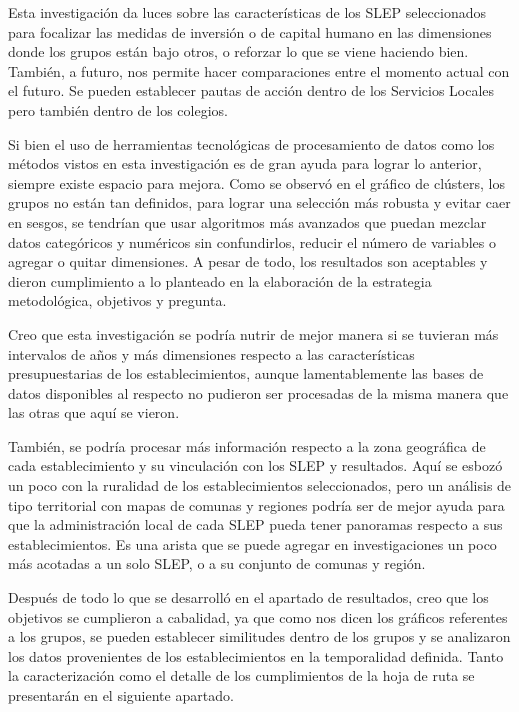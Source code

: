 \documentclass[
  12pt,
  letterpaper,
]{article}
\begin{document}
Esta investigación da luces sobre las características de los SLEP seleccionados para focalizar las medidas de inversión o de capital humano en las dimensiones donde los grupos están bajo otros, o reforzar lo que se viene haciendo bien.
También, a futuro, nos permite hacer comparaciones entre el momento actual con el futuro.
Se pueden establecer pautas de acción dentro de los Servicios Locales pero también dentro de los colegios.

Si bien el uso de herramientas tecnológicas de procesamiento de datos como los métodos vistos en esta investigación es de gran ayuda para lograr lo anterior, siempre existe espacio para mejora.
Como se observó en el gráfico de clústers, los grupos no están tan definidos, para lograr una selección más robusta y evitar caer en sesgos, se tendrían que usar algoritmos más avanzados que puedan mezclar datos categóricos y numéricos sin confundirlos, reducir el número de variables o agregar o quitar dimensiones.
A pesar de todo, los resultados son aceptables y dieron cumplimiento a lo planteado en la elaboración de la estrategia metodológica, objetivos y pregunta.

Creo que esta investigación se podría nutrir de mejor manera si se tuvieran más intervalos de años y más dimensiones respecto a las características presupuestarias de los establecimientos, aunque lamentablemente las bases de datos disponibles al respecto no pudieron ser procesadas de la misma manera que las otras que aquí se vieron.

También, se podría procesar más información respecto a la zona geográfica de cada establecimiento y su vinculación con los SLEP y resultados.
Aquí se esbozó un poco con la ruralidad de los establecimientos seleccionados, pero un análisis de tipo territorial con mapas de comunas y regiones podría ser de mejor ayuda para que la administración local de cada SLEP pueda tener panoramas respecto a sus establecimientos.
Es una arista que se puede agregar en investigaciones un poco más acotadas a un solo SLEP, o a su conjunto de comunas y región.

Después de todo lo que se desarrolló en el apartado de resultados, creo que los objetivos se cumplieron a cabalidad, ya que como nos dicen los gráficos referentes a los grupos, se pueden establecer similitudes dentro de los grupos y se analizaron los datos provenientes de los establecimientos en la temporalidad definida.
Tanto la caracterización como el detalle de los cumplimientos de la hoja de ruta se presentarán en el siguiente apartado.
\end{document}
